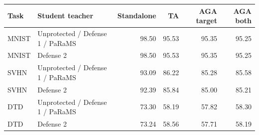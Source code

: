 \begin{tabular}{llrrrr}
\toprule
Task & Student teacher & Standalone & TA & AGA target & AGA both \\
\midrule
MNIST & Unprotected / Defense 1 / PaRaMS & 98.50 & 95.53 & 95.35 & 95.25 \\
MNIST & Defense 2 & 98.50 & 95.53 & 95.35 & 95.25 \\
SVHN & Unprotected / Defense 1 / PaRaMS & 93.09 & 86.22 & 85.28 & 85.58 \\
SVHN & Defense 2 & 92.39 & 85.84 & 85.00 & 85.21 \\
DTD & Unprotected / Defense 1 / PaRaMS & 73.30 & 58.19 & 57.82 & 58.30 \\
DTD & Defense 2 & 73.24 & 58.56 & 57.71 & 58.19 \\
\bottomrule
\end{tabular}
